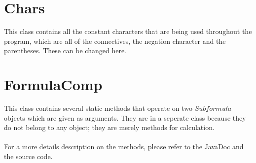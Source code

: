 \documentclass{article}
\begin{document}
\section{Chars}
This class contains all the constant characters that are being used throughout the program, which are all of the connectives, the negation character and the parentheses. These can be changed here.

\section{FormulaComp}
This class contains several static methods that operate on two $Subformula$ objects which are given as arguments. They are in a seperate class because they do not belong to any object; they are merely methods for calculation.
\\\\
For a more details description on the methods, please refer to the JavaDoc and the source code.
\end{document}

